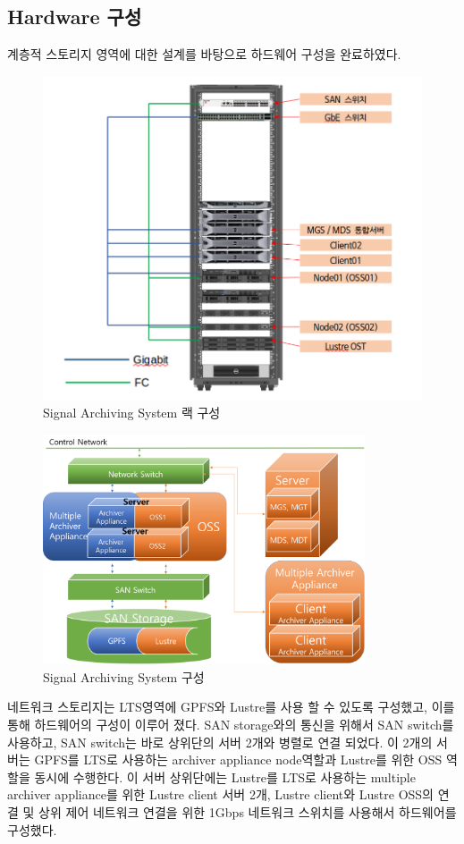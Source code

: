 \documentclass[11pt
  , a4paper
  , article
  , oneside
]{memoir}
\begin{document}
\subsection{Hardware 구성}
계층적 스토리지 영역에 대한 설계를 바탕으로 하드웨어 구성을 완료하였다. 
	\begin{figure}[h!]
		\centering
		\includegraphics[width=1\textwidth, height=0.7\textheight]{./images/124.png}
		\caption{Signal Archiving System 랙 구성}
	\end{figure}
\clearpage
	\begin{figure}[h!]
		\centering
		\includegraphics[width=0.85\textwidth, height=0.5\textheight]{./images/125.png}
		\caption{Signal Archiving System 구성}
	\end{figure}
	네트워크 스토리지는 LTS영역에 GPFS와 Lustre를 사용 할 수 있도록 구성했고, 이를 통해 하드웨어의 구성이 이루어 졌다. SAN storage와의 통신을 위해서 SAN switch를 사용하고, SAN switch는 바로 상위단의 서버 2개와 병렬로 연결 되었다. 이 2개의 서버는 GPFS를 LTS로 사용하는 archiver appliance node역할과 Lustre를 위한 OSS 역할을 동시에 수행한다. 이 서버 상위단에는 Lustre를 LTS로 사용하는 multiple archiver appliance를 위한 Lustre client 서버 2개, Lustre client와 Lustre OSS의 연결 및 상위 제어 네트워크 연결을 위한 1Gbps 네트워크 스위치를 사용해서 하드웨어를 구성했다.
	
\end{document}
